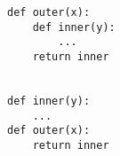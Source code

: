 \begin{lstlisting}
def outer(x):
    def inner(y):
        ...
    return inner


def inner(y):
    ...
def outer(x):
    return inner

\end{lstlisting}